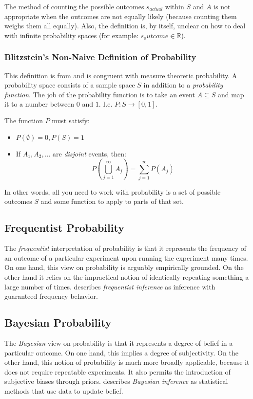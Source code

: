 The method of counting the possible outcomes $s_{actual}$ within $S$ and $A$ is not appropriate when the outcomes are not equally likely (because counting them weighs them all equally). Also, the definition is, by itself, unclear on how to deal with infinite probability spaces (for example: $s_outcome \in \mathbb{R}$).

\subsubsection{Blitzstein's Non-Naive Definition of Probability}
This definition is from \cite{blitzstein2019introduction} and is congruent with measure theoretic probability. A probability space consists of a sample space $S$ in addition to a \textit{probability function}. The job of the probability function is to take an event $A\subseteq S$ and map it to a number between $0$ and $1$. I.e.  $P: S \rightarrow [0,1]$.

The function $P$ must satisfy:

\begin{itemize}
\item $P(\emptyset) = 0, P(S) = 1$
\item If $A_1, A_2,...$ are \textit{disjoint} events, then: \begin{equation}P\left(\bigcup^{\infty}_{j=1}A_j \right) = \sum_{j=1}^{\infty}P(A_j)\end{equation}
\end{itemize}

In other words, all you need to work with probability is a set of possible outcomes $S$ and some function to apply to parts of that set. 


\subsection{Frequentist Probability}
The \textit{frequentist} interpretation of probability is that it represents the frequency of an outcome of a particular experiment upon running the experiment many times. On one hand, this view on probability is arguably empirically grounded. On the other hand it relies on the impractical notion of identically repeating something a large number of times.  describes \textit{frequentist inference} as inference with guaranteed frequency behavior. 

\subsection{Bayesian Probability}
The \textit{Bayesian} view on probability is that it represents a degree of belief in a particular outcome. On one hand, this implies a degree of subjectivity. On the other hand, this notion of probability is much more broadly applicable, because it does not require repeatable experiments. It also permits the introduction of subjective biases through priors.  describes \textit{Bayesian inference} as statistical methods that use data to update belief. 


